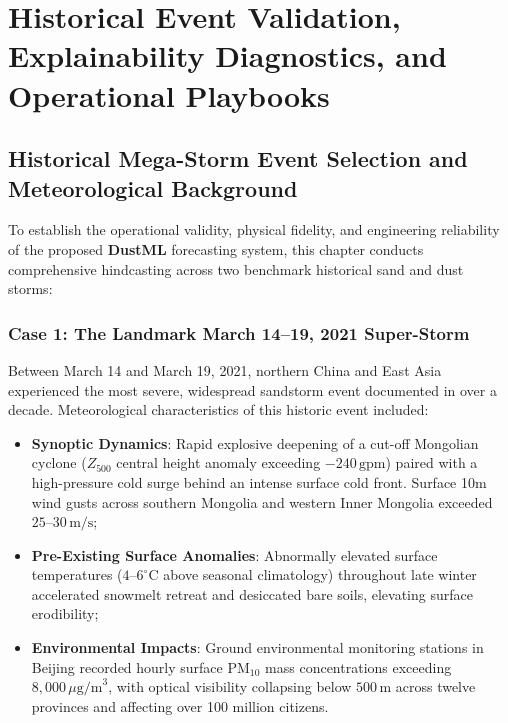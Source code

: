 
\chapter{Historical Event Validation, Explainability Diagnostics, and Operational Playbooks}
\label{chap:validation_playbooks}

\section{Historical Mega-Storm Event Selection and Meteorological Background}
\label{sec:case_selection}

To establish the operational validity, physical fidelity, and engineering reliability of the proposed \textbf{DustML} forecasting system, this chapter conducts comprehensive hindcasting across two benchmark historical sand and dust storms:

\subsection{Case 1: The Landmark March 14--19, 2021 Super-Storm}
\label{subsec:case1_march2021}

Between March 14 and March 19, 2021, northern China and East Asia experienced the most severe, widespread sandstorm event documented in over a decade. Meteorological characteristics of this historic event included:
\begin{itemize}
    \item \textbf{Synoptic Dynamics}: Rapid explosive deepening of a cut-off Mongolian cyclone ($Z_{500}$ central height anomaly exceeding $-240\,\text{gpm}$) paired with a high-pressure cold surge behind an intense surface cold front. Surface 10m wind gusts across southern Mongolia and western Inner Mongolia exceeded $25\text{--}30\,\text{m/s}$;
    \item \textbf{Pre-Existing Surface Anomalies}: Abnormally elevated surface temperatures ($4\text{--}6^\circ\text{C}$ above seasonal climatology) throughout late winter accelerated snowmelt retreat and desiccated bare soils, elevating surface erodibility;
    \item \textbf{Environmental Impacts}: Ground environmental monitoring stations in Beijing recorded hourly surface $\text{PM}_{10}$ mass concentrations exceeding $8{,}000\,\mu\text{g/m}^3$, with optical visibility collapsing below $500\,\text{m}$ across twelve provinces and affecting over 100 million citizens.
\end{itemize}

